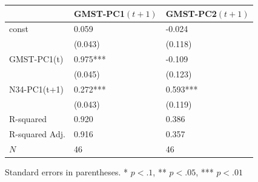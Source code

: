 \begin{tabular}{lll}
\hline
               & GMST-PC1$(t+1)$ & GMST-PC2$(t+1)$  \\
\hline
const          & 0.059             & -0.024             \\
               & (0.043)           & (0.118)            \\
GMST-PC1(t)    & 0.975***          & -0.109             \\
               & (0.045)           & (0.123)            \\
N34-PC1(t+1)   & 0.272***          & 0.593***           \\
               & (0.043)           & (0.119)            \\
R-squared      & 0.920             & 0.386              \\
R-squared Adj. & 0.916             & 0.357              \\
$N$          & 46                & 46                 \\
\hline
\end{tabular}

{Standard errors in parentheses. * $p<.1$, ** $p<.05$, *** $p<.01$}